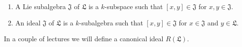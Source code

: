 \begin{enumerate}[label=(\alph*)]
	\item A Lie subalgebra $\mathfrak{J}$ of $\mathfrak{L}$ is a $k$-subspace such
		that $[x, y] \in \mathfrak{J}$ for $x, y \in \mathfrak{J}$.
	\item An ideal $\mathfrak{J}$ of $\mathfrak{L}$ is a $k$-subalgebra such that
		$[x, y] \in \mathfrak{J}$ for $x \in \mathfrak{J}$ and $y \in \mathfrak{L}$.
\end{enumerate}

In a couple of lectures we will define a canonical ideal $R(\mathfrak{L})$.
